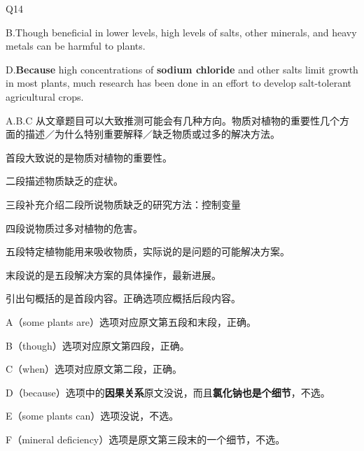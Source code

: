 \begin{blk}
    \begin{qst}
        Q14
    \end{qst}

    \begin{chc}
        B.Though beneficial in lower levels, high levels of salts, other minerals, and heavy metals can be harmful to plants.

        D.\textbf{Because} high concentrations of \textbf{sodium chloride} and other salts limit growth in most plants, much research has been done in an effort to develop salt-tolerant agricultural crops.
    \end{chc}

    \begin{nlz}
        A.B.C 从文章题目可以大致推测可能会有几种方向。物质对植物的重要性几个方面的描述／为什么特别重要解释／缺乏物质或过多的解决方法。

        首段大致说的是物质对植物的重要性。

        二段描述物质缺乏的症状。

        三段补充介绍二段所说物质缺乏的研究方法：控制变量

        四段说物质过多对植物的危害。

        五段特定植物能用来吸收物质，实际说的是问题的可能解决方案。

        末段说的是五段解决方案的具体操作，最新进展。

        引出句概括的是首段内容。正确选项应概括后段内容。

        A（some plants are）选项对应原文第五段和末段，正确。

        B（though）选项对应原文第四段，正确。

        C（when）选项对应原文第二段，正确。

        D（because）选项中的\textbf{因果关系}原文没说，而且\textbf{氯化钠也是个细节}，不选。

        E（some plants can）选项没说，不选。

        F（mineral deficiency）选项是原文第三段末的一个细节，不选。
    \end{nlz}
\end{blk}
